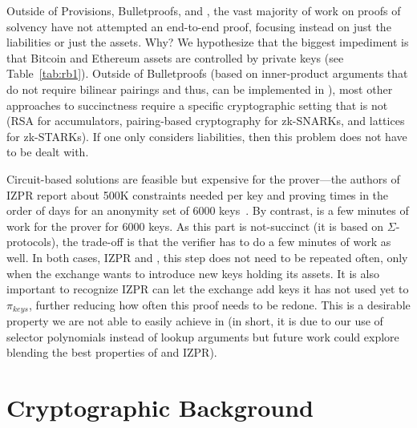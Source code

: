 Outside of Provisions, Bulletproofs, and \Sys, the vast majority of work on proofs of solvency have not attempted an end-to-end proof, focusing instead on just the liabilities or just the assets. Why? We hypothesize that the biggest impediment is that Bitcoin and Ethereum assets are controlled by \secp private keys (see Table~\ref{tab:rb1}). Outside of Bulletproofs (based on inner-product arguments that do not require bilinear pairings and thus, can be implemented in \secp), most other approaches to succinctness require a specific cryptographic setting that is not \secp (\ie RSA for accumulators, pairing-based cryptography for zk-SNARKs, and lattices for zk-STARKs). If one only considers liabilities, then this problem does not have to be dealt with.

Circuit-based solutions are feasible but expensive for the prover---the authors of IZPR report about 500K constraints needed per key and proving times in the order of days for an anonymity set of 6000 keys~\cite{izpr}. By contrast, \Sys is a few minutes of work for the prover for 6000 keys. As this part is not-succinct (it is based on $\Sigma$-protocols), the trade-off is that the verifier has to do a few minutes of work as well. In both cases, IZPR and \Sys, this step does not need to be repeated often, only when the exchange wants to introduce new keys holding its assets. It is also important to recognize IZPR can let the exchange add keys it has not used yet to $\pi_{keys}$, further reducing how often this proof needs to be redone. This is a desirable property we are not able to easily achieve in \Sys (in short, it is due to our  use of selector polynomials instead of lookup arguments but future work could explore blending the best properties of \Sys and IZPR). 


\section{Cryptographic Background}

